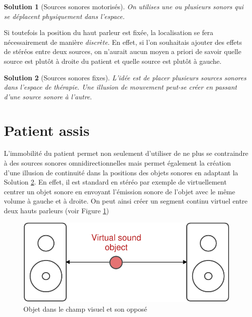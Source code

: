 \documentclass[french]{article}
\newtheorem{sol}{Solution}
\begin{document}
\begin{sol}[Sources sonores motorisés]
	On utilises une ou plusieurs sonors qui se déplacent physiquement dans l'espace.
\end{sol}

Si toutefois la position du haut parleur est fixée, la localisation se fera nécessairement de manière \emph{discrète}. En effet, si l'on souhaitais ajouter  des effets de stéréos entre deux sources,  on n'aurait aucun moyen a priori de savoir quelle source est plutôt à droite du patient et quelle source est plutôt à gauche. 

\begin{sol}[Sources sonores fixes]
	\label{solSrcFixe}
	L'idée est de placer plusieurs sources sonores dans l'espace de thérapie. Une illusion de mouvement peut-se créer en passant d'une source sonore à l'autre.
\end{sol}

\section{Patient assis}

L'immobilité du patient permet non seulement d'utiliser de ne plus se contraindre à des sources sonores omnidirectionnelles mais permet également la création d'une illusion de continuité dans la positions des objets sonores en adaptant la Solution \ref{solSrcFixe}. En effet, il est standard en stéréo par exemple de virtuellement centrer un objet sonore en envoyant l'émission sonore de l'objet avec le même volume à gauche et à droite. On peut ainsi créer un segment continu virtuel entre deux hauts parleurs (voir Figure \ref{stereo-localization})

\begin{figure}[!h]
	\centering
	\includegraphics[scale = 0.7]{schemas/stereo-localization.pdf}
	\caption{Objet dans le champ visuel et son opposé}
	\label{stereo-localization}
\end{figure}
\end{document}

